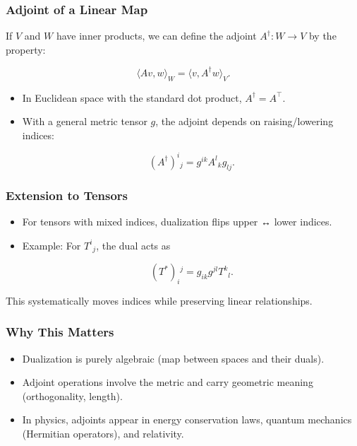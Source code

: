 \documentclass[
  letterpaper,
  DIV=11,
  numbers=noendperiod]{scrreprt}
\providecommand{\tightlist}{%
  \setlength{\itemsep}{0pt}\setlength{\parskip}{0pt}}
\begin{document}
\subsubsection{Adjoint of a Linear Map}\label{adjoint-of-a-linear-map-1}

If \(V\) and \(W\) have inner products, we can define the adjoint
\(A^\dagger: W \to V\) by the property:

\[
\langle Av, w \rangle_W = \langle v, A^\dagger w \rangle_V.
\]

\begin{itemize}
\item
  In Euclidean space with the standard dot product,
  \(A^\dagger = A^\top\).
\item
  With a general metric tensor \(g\), the adjoint depends on
  raising/lowering indices:

  \[
  (A^\dagger)^i{}_j = g^{ik} A^l{}_k g_{lj}.
  \]
\end{itemize}

\subsubsection{Extension to Tensors}\label{extension-to-tensors}

\begin{itemize}
\item
  For tensors with mixed indices, dualization flips upper ↔ lower
  indices.
\item
  Example: For \(T^i{}_j\), the dual acts as

  \[
  (T^*)_i{}^j = g_{ik} g^{jl} T^k{}_l.
  \]
\end{itemize}

This systematically moves indices while preserving linear relationships.

\subsubsection{Why This Matters}\label{why-this-matters-31}

\begin{itemize}
\tightlist
\item
  Dualization is purely algebraic (map between spaces and their duals).
\item
  Adjoint operations involve the metric and carry geometric meaning
  (orthogonality, length).
\item
  In physics, adjoints appear in energy conservation laws, quantum
  mechanics (Hermitian operators), and relativity.
\end{itemize}
\end{document}
